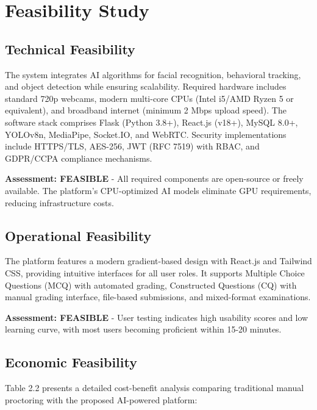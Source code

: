 \section{Feasibility Study}

\subsection{Technical Feasibility}

The system integrates AI algorithms for facial recognition, behavioral tracking, and object detection while ensuring scalability. Required hardware includes standard 720p webcams, modern multi-core CPUs (Intel i5/AMD Ryzen 5 or equivalent), and broadband internet (minimum 2 Mbps upload speed). The software stack comprises Flask (Python 3.8+), React.js (v18+), MySQL 8.0+, YOLOv8n, MediaPipe, Socket.IO, and WebRTC. Security implementations include HTTPS/TLS, AES-256, JWT (RFC 7519) with RBAC, and GDPR/CCPA compliance mechanisms.

\textbf{Assessment: FEASIBLE} - All required components are open-source or freely available. The platform's CPU-optimized AI models eliminate GPU requirements, reducing infrastructure costs.

\subsection{Operational Feasibility}

The platform features a modern gradient-based design with React.js and Tailwind CSS, providing intuitive interfaces for all user roles. It supports Multiple Choice Questions (MCQ) with automated grading, Constructed Questions (CQ) with manual grading interface, file-based submissions, and mixed-format examinations.

\textbf{Assessment: FEASIBLE} - User testing indicates high usability scores and low learning curve, with most users becoming proficient within 15-20 minutes.

\subsection{Economic Feasibility}

Table 2.2 presents a detailed cost-benefit analysis comparing traditional manual proctoring with the proposed AI-powered platform:

